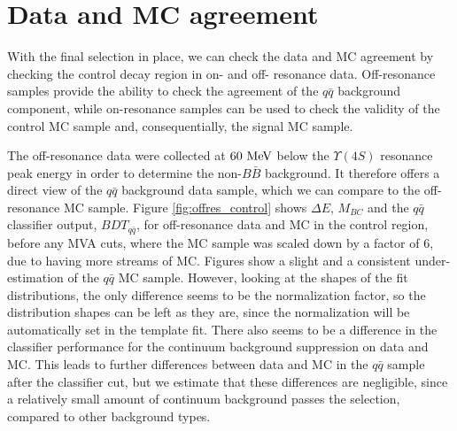 \section{Data and MC agreement}

With the final selection in place, we can check the data and MC agreement by checking the control decay region in on- and off- resonance data. Off-resonance samples provide the ability to check the agreement of the $q\bar q$ background component, while on-resonance samples can be used to check the validity of the control MC sample and, consequentially, the signal MC sample.

The off-resonance data were collected at $60\mathrm{~MeV}$ below the $\Upsilon(4S)$ resonance peak energy in order to determine the non-$B\bar B$ background. It therefore offers a direct view of the $q\bar q$ background data sample, which we can compare to the off-resonance MC sample. Figure \ref{fig:offres_control} shows $\Delta E$, $M_{BC}$ and the $q \bar q$ classifier output, $BDT_{q\bar q}$, for off-resonance data and MC in the control region, before any MVA cuts, where the MC sample was scaled down by a factor of $6$, due to having more streams of MC. Figures show a slight and a consistent under-estimation of the $q\bar q$ MC sample. However, looking at the shapes of the fit distributions, the only difference seems to be the normalization factor, so the distribution shapes can be left as they are, since the normalization will be automatically set in the template fit. There also seems to be a difference in the classifier performance for the continuum background suppression on data and MC. This leads to further differences between data and MC in the $q \bar q$ sample after the classifier cut, but we estimate that these differences are negligible, since a relatively small amount of continuum background passes the selection, compared to other background types.
